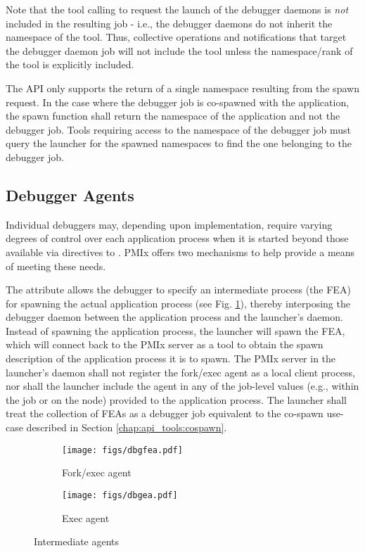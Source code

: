 {\adviceuserstart
Note that the tool calling  to request the launch of the debugger daemons is \emph{not} included in the resulting job - i.e., the debugger daemons do not inherit the namespace of the tool. Thus, collective operations and notifications that target the debugger daemon job will not include the tool unless the namespace/rank of the tool is explicitly included.

The  \ac{API} only supports the return of a single namespace resulting from the spawn request. In the case where the debugger job is co-spawned with the application, the spawn function shall return the namespace of the application and not the debugger job. Tools requiring access to the namespace of the debugger job must query the launcher for the spawned namespaces to find the one belonging to the debugger job.
\adviceuserend

\subsection{Debugger Agents}
\label{api:tools:debugger:agent}

Individual debuggers may, depending upon implementation, require varying degrees of control over each application process when it is started beyond those available via directives to . \ac{PMIx} offers two mechanisms to help provide a means of meeting these needs.

The  attribute allows the debugger to specify an intermediate process (the \ac{FEA}) for spawning the actual application process (see Fig. \ref{fig:dbgfea}), thereby interposing the debugger daemon between the application process and the launcher's daemon. Instead of spawning the application process, the launcher will spawn the \ac{FEA}, which will connect back to the \ac{PMIx} server as a tool to obtain the spawn description of the application process it is to spawn. The \ac{PMIx} server in the launcher's daemon shall not register the fork/exec agent as a local client process, nor shall the launcher include the agent in any of the job-level values (e.g.,  within the job or  on the node) provided to the application process. The launcher shall treat the collection of \acp{FEA} as a debugger job equivalent to the co-spawn use-case described in Section \ref{chap:api_tools:cospawn}.

\begin{figure*}[ht!]
\centering
\begin{subfigure}{.5\textwidth}
  \centering
  \texttt{[image: figs/dbgfea.pdf]}
  \caption{Fork/exec agent}
  \label{fig:dbgfea}
\end{subfigure}%
\begin{subfigure}{.5\textwidth}
  \centering
  \texttt{[image: figs/dbgea.pdf]}
  \caption{Exec agent}
  \label{fig:dbgea}
\end{subfigure}
\caption{Intermediate agents}
\label{fig:dbginta}
\end{figure*}

}
